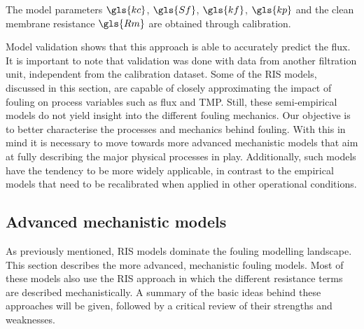 The model parameters $\gls{kc}$, $\gls{Sf}$, $\gls{kf}$, $\gls{kp}$ and the clean membrane resistance $\gls{Rm}$ are obtained through calibration.\par
Model validation shows that this approach is able to accurately predict the flux. It is important to note that validation was done with data from another filtration unit, independent from the calibration dataset. Some of the \gls{RIS} models, discussed in this section, are capable of closely approximating the impact of fouling on process variables such as flux and \gls{TMP}. Still, these semi-empirical models do not yield insight into the different fouling mechanics. Our objective is to better characterise the processes and mechanics behind fouling. With this in mind it is necessary to move towards more advanced mechanistic models that aim at fully describing the major physical processes in play. Additionally, such models have the tendency to be more widely applicable, in contrast to the empirical models that need to be recalibrated when applied in other operational conditions.

\subsection{Advanced mechanistic models}
As previously mentioned, \gls{RIS} models dominate the fouling modelling landscape. This section describes the more advanced, mechanistic fouling models. Most of these models also use the \gls{RIS} approach in which the different resistance terms are described mechanistically. A summary of the basic ideas behind these approaches will be given, followed by a critical review of their strengths and weaknesses.
